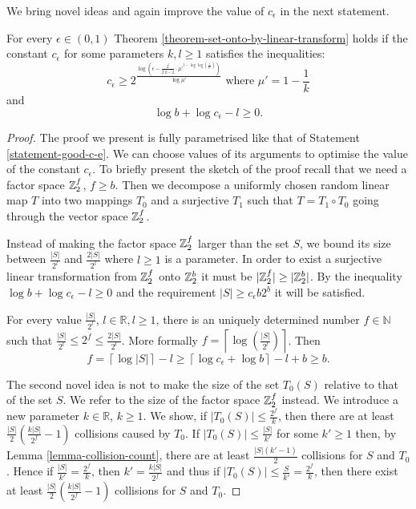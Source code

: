 We bring novel ideas and again improve the value of $c_\epsilon$ in the next statement.
\begin{statement}
\label{statement-better-c-e}
For every $\epsilon \in (0,1)$ Theorem \ref{theorem-set-onto-by-linear-transform} holds if the constant $c_{\epsilon}$ for some parameters $k, l \geq 1$ satisfies the inequalities:
\begin{equation}
\label{inequality-better-c-e}
c_\epsilon \geq 2 ^ {\frac{\log \left({\epsilon - \frac{2^l}{2^l k - 2}}\cdot{{\mu'} ^ {l - \log \log \left( \frac{1}{\mu'} \right)}}\right)}{\log {\mu'}}} \text{ where $\mu' = 1 - \frac{1}{k}$}
\end{equation}
and 
\[
	\log b + \log c_{\epsilon} - l \geq 0 \text{.}
\]
\end{statement}
\begin{proof}
The proof we present is fully parametrised like that of Statement \ref{statement-good-c-e}. We can choose values of its arguments to optimise the value of the constant $c_\epsilon$. To briefly present the sketch of the proof recall that we need a factor space $\mathbb{Z}_{2}^{f}$, $f \geq b$. Then we decompose a uniformly chosen random linear map $T$ into two mappings $T_0$ and a surjective $T_1$ such that $T = T_1 \circ T_0$ going through the vector space $\mathbb{Z}_{2}^{f}$.

Instead of making the factor space $\mathbb{Z}_{2}^{f}$ larger than the set $S$, we bound its size between $\frac{|S|}{2 ^ l}$ and $\frac{2|S|}{2 ^ l}$ where $l \geq 1$ is a parameter. In order to exist a surjective linear transformation from $\mathbb{Z}_{2}^{f}$ onto $\mathbb{Z}_{2}^{b}$ it must be $|\mathbb{Z}_{2}^{f}| \geq |\mathbb{Z}_{2}^{b}|$. By the inequality $\log b + \log c_{\epsilon} - l \geq 0$ and the requirement $|S| \geq c_\epsilon b 2 ^ b$ it will be satisfied.

For every value $\frac{|S|}{2^l}$, $l \in \mathbb{R}, l \geq 1$, there is an uniquely determined number $f \in \mathbb{N}$ such that $\frac{|S|}{2 ^ l} \leq 2 ^ f \leq \frac{2|S|}{2 ^ l}$. More formally $f = \left\lceil \log \left( \frac{|S|}{2 ^ l} \right) \right\rceil$. Then \[ f = \left\lceil \log|S| \right\rceil - l \geq \left\lceil \log c_{\epsilon} + \log b \right\rceil - l + b \geq b \text{.} \]

The second novel idea is not to make the size of the set $T_0(S)$ relative to that of the set $S$. We refer to the size of the factor space $\mathbb{Z}_{2}^{f}$ instead. We introduce a new parameter $k \in \mathbb{R}$, $k \geq 1$. We show, if $|T_0(S)| \leq \frac{2 ^ f}{k}$, then there are at least $\frac{|S|}{2}\left(\frac{k|S|}{2 ^ f} - 1\right)$ collisions caused by $T_0$. If $|T_0(S)| \leq \frac{|S|}{k'}$ for some $k' \geq 1$ then, by Lemma \ref{lemma-collision-count}, there are at least $\frac{|S|(k' - 1)}{2}$ collisions for $S$ and $T_0$. Hence if $\frac{|S|}{k'} = \frac{2 ^ f}{k}$,  then $k' = \frac{k|S|}{2 ^ f}$ and thus if $|T_0(S)| \leq \frac{S}{k'} = \frac{2 ^ f}{k}$, then there exist at least $\frac{|S|}{2}(\frac{k|S|}{2 ^ f} - 1)$ collisions for $S$ and $T_0$.


\end{proof}
